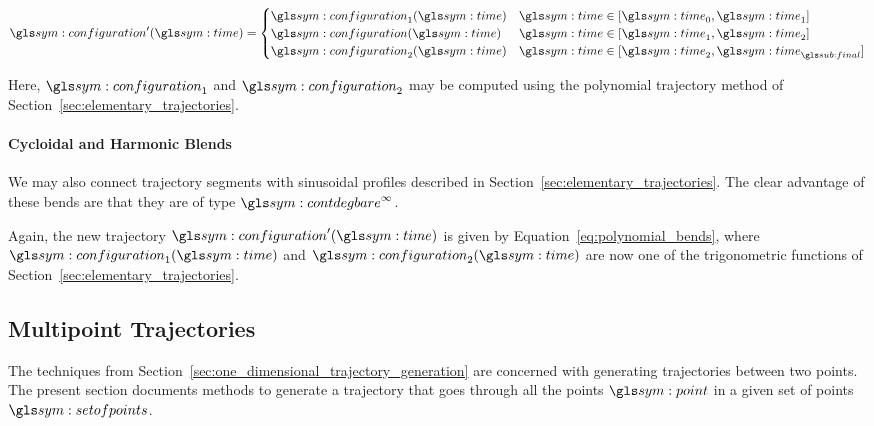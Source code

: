 				\begin{equation}
					\configuration'(\timesym) =
					\begin{cases}
						\configuration_1(\timesym) & \timesym \in [\timesym_0, \timesym_1] \\
						\configuration(\timesym) & \timesym \in [\timesym_1, \timesym_2] \\
						\configuration_2(\timesym) & \timesym \in [\timesym_2, \timesym_{\final}] \\
					\end{cases}
					\label{eq:polynomial_bends}
				\end{equation}

				Here, $\configuration_1$ and $\configuration_2$ may be computed
				using the polynomial trajectory method of
				Section~\ref{sec:elementary_trajectories}.



			\paragraph{Cycloidal and Harmonic Blends}%
			\label{cycloidal_and_harmonic_blends}

				We may also connect trajectory segments with sinusoidal
				profiles described in Section~\ref{sec:elementary_trajectories}.
				The clear advantage of these bends are that they are of type
				$\contdeg{\infty}$.

				Again, the new trajectory $\configuration'(\timesym)$ is given
				by Equation~\ref{eq:polynomial_bends}, where
				$\configuration_1(\timesym)$ and $\configuration_2(\timesym)$
				are now one of the trigonometric functions of
				Section~\ref{sec:elementary_trajectories}.

	\subsection{Multipoint Trajectories}%
	\label{sec:multipoint_trajectories}

		The techniques from
		Section~\ref{sec:one_dimensional_trajectory_generation} are concerned
		with generating trajectories between two points. The present section
		documents methods to generate a trajectory that goes through all the
		points $\point$ in a given set of points $\setofpoints$.

